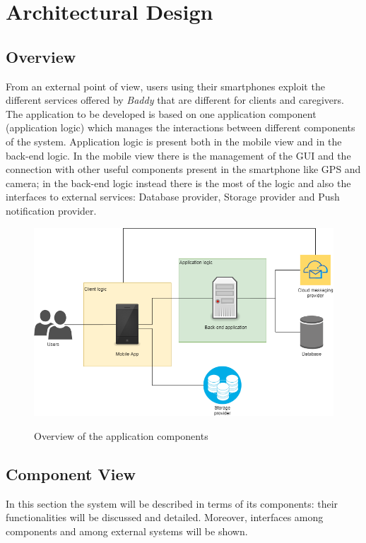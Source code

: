 \documentclass[../../dd.tex]{subfiles}
\begin{document}
    \chapter{Architectural Design}
    \section{Overview}
    From an external point of view, users using their smartphones exploit the different
    services offered by \textit{Baddy} that are different for clients and caregivers.
    The application to be developed is based on one application component (application logic) which manages the interactions
    between different components of the system.
    Application logic is present both in the mobile view and in the back-end logic.
    In the mobile view there is the management of the GUI and the connection with other useful components
    present in the smartphone like GPS and camera; in the back-end logic instead there is the most of the logic and also the interfaces to external services:
    Database provider, Storage provider and Push notification provider.


    \begin{figure}[H]
        \centering
        \includegraphics[scale=0.5]{assets/overview.png}\\[1.6 cm]
        \caption[\textit{Deployment} Diagram]{Overview of the application components}
    \end{figure}
    \section{Component View}
    In this section the system will be described in terms of its components: their
    functionalities will be discussed and detailed. Moreover, interfaces among components and among external systems will be shown.\\
\end{document}
